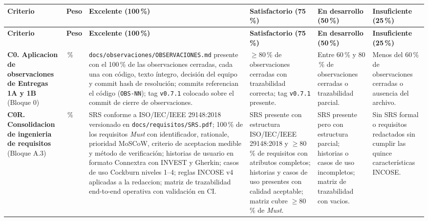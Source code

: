 \documentclass[11pt,a4paper]{article}
\begin{document}
{
\footnotesize
\renewcommand{\arraystretch}{1.3}
\begin{longtable}{|L{3.0cm}|C{0.9cm}|L{2.5cm}|L{2.5cm}|L{2.5cm}|L{2.3cm}|}
\hline
{}
{\color{white}\textbf{Criterio}} &
{\color{white}\textbf{Peso}} &
{\color{white}\textbf{Excelente (100\,\%)}} &
{\color{white}\textbf{Satisfactorio (75\,\%)}} &
{\color{white}\textbf{En desarrollo (50\,\%)}} &
{\color{white}\textbf{Insuficiente (25\,\%)}} \\
\hline
\endfirsthead

\hline
{}
{\color{white}\textbf{Criterio}} &
{\color{white}\textbf{Peso}} &
{\color{white}\textbf{Excelente (100\,\%)}} &
{\color{white}\textbf{Satisfactorio (75\,\%)}} &
{\color{white}\textbf{En desarrollo (50\,\%)}} &
{\color{white}\textbf{Insuficiente (25\,\%)}} \\
\hline
\endhead

\textbf{C0. Aplicacion de observaciones de Entregas 1A y 1B} (Bloque 0) &
\,\% &
\texttt{docs/observaciones/OBSERVACIONES.md} presente con el 100\,\% de las observaciones cerradas, cada una con c\'{o}digo, texto \'{i}ntegro, decisi\'{o}n del equipo y commit hash de resoluci\'{o}n; commits referencian el c\'{o}digo (\texttt{OBS-NN}); tag \texttt{v0.7.1} colocado sobre el commit de cierre de observaciones. &
$\geq 80$\,\% de observaciones cerradas con trazabilidad correcta; tag \texttt{v0.7.1} presente. &
Entre $60$\,\% y $80$\,\% de observaciones cerradas o trazabilidad parcial. &
Menos del $60$\,\% de observaciones cerradas o ausencia del archivo. \\

\textbf{C0R. Consolidacion de ingenieria de requisitos} (Bloque A.3) &
\,\% &
SRS conforme a ISO/IEC/IEEE 29148:2018 versionado en \texttt{docs/requisitos/SRS.pdf}; 100\,\% de los requisitos \emph{Must} con identificador, rationale, prioridad MoSCoW, criterio de aceptacion medible y m\'{e}todo de verificaci\'{o}n; historias de usuario en formato Connextra con INVEST y Gherkin; casos de uso Cockburn niveles 1--4; reglas INCOSE v4 aplicadas a la redaccion; matriz de trazabilidad end-to-end operativa con validaci\'{o}n en CI. &
SRS presente con estructura ISO/IEC/IEEE 29148:2018 y $\geq 80$\,\% de requisitos con atributos completos; historias y casos de uso presentes con calidad aceptable; matriz cubre $\geq 80$\,\% de \emph{Must}. &
SRS presente pero con estructura parcial; historias o casos de uso incompletos; matriz de trazabilidad con vacios. &
Sin SRS formal o requisitos redactados sin cumplir las quince caracter\'{i}sticas INCOSE. \\


\end{longtable}}
\end{document}

